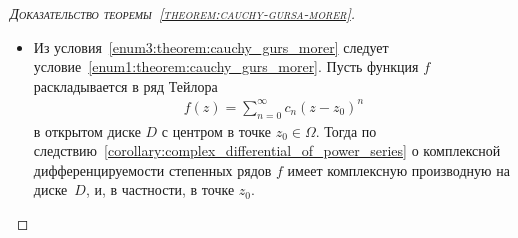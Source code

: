 \documentclass[../complex-analysis.tex]{subfiles}
\begin{document}
\begin{proof}[\normalfont\textsc{Доказательство теоремы~\ref{theorem:cauchy-gursa-morer}}]
\begin{itemize}
   Далее, дробь $ 1/(z-b) $ можно разложить в сумму геометрической прогрессии:
   \begin{align}
    \label{eq:sum_geom_series:cauchy_gurs_morer}
    \frac{1}{z-b} = \frac{1}{(z-a)+(a-b)} = \frac{1}{z-a} \cdot \frac{1}{1 - \frac{b-a}{z-a}} = \sum_{n=0}^{\infty} \frac{(b-a)^{n}}{(z-a)^{n+1}}.
   \end{align} Ряд~\eqref{eq:sum_geom_series:cauchy_gurs_morer} сходится для всех $ z \in C_\rho $, причём равномерно по $ z $, ведь
   \begin{align*}
    \left| \frac{b-a}{z-a} \right| = \frac{\left| b-a \right|}{\rho} < 1,
   \end{align*} и равномерность не нарушится после умножения на $ f(z) $. Подставим полученное в \eqref{eq:cauchy_formula:cauchy_gurs_morer}:
   \begin{align*}
    f(b) &= \frac{1}{2\pi i} \int_{C_\rho} f(z) \cdot \sum_{n=0}^{\infty}\frac{(b-a)^{n}}{(z-a)^{n+1}}\,dz.
   \end{align*} Так как ряд~\eqref{eq:sum_geom_series:cauchy_gurs_morer} сходится равномерно (всё суммируемо), то по теореме Фубини можно поменять местами сумму и интеграл. Получаем
   \begin{align}
    \label{eq:taylor_series:cauchy_gurs_morer}
    f(b) = \sum_{n=0}^{\infty} c_n (b-a)^{n},
   \end{align} где
   \begin{align*}
    c_n = \frac{1}{2\pi i} \int_{C_\rho} \frac{f(z)\,dz}{(z-a)^{n+1}}.
   \end{align*}

   Мы установили равенство~\eqref{eq:taylor_series:cauchy_gurs_morer} для любого $ b \in B(a,\rho) $. Заметим, что коэффициенты $ c_n $ не зависят от выбора $ \rho $, так как по следствию~\ref{corollary:complex_differential_of_power_series} о комплексной дифференцируемости степенных рядов их можно восстановить, зная лишь все производные функции~$ f $ в точке~$ a $. Например, $ c_0 = f(a) $, $ c_1 = f'(a) $, $ c_2 = f''(a) / 2 $, и так далее. Поэтому, можно устремить $ \rho \to r $ и получить равенство~\eqref{eq:taylor_series:cauchy_gurs_morer} на всём диске $ D $.

  \item Из условия~\ref{enum3:theorem:cauchy_gurs_morer} следует условие~\ref{enum1:theorem:cauchy_gurs_morer}. Пусть функция $ f $ раскладывается в ряд Тейлора
   \begin{align*}
    f(z) = \sum_{n=0}^{\infty} c_n(z-z_0)^{n}
   \end{align*} в открытом диске $ D $ с центром в точке $ z_0 \in \Omega $. Тогда по следствию~\ref{corollary:complex_differential_of_power_series} о комплексной дифференцируемости степенных рядов $ f $ имеет комплексную производную на диске~$ D $, и, в частности, в точке $ z_0 $.


\end{itemize}
\end{proof}
\end{document}
